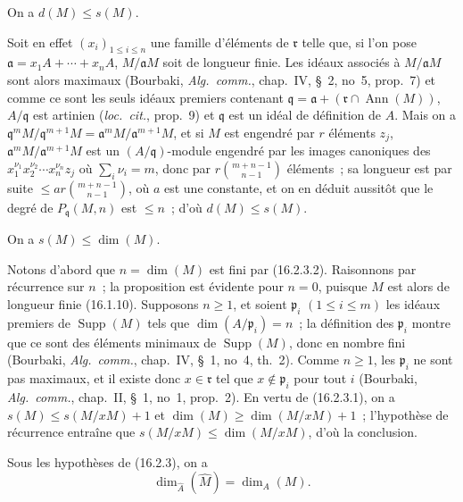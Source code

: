 \begin{env}[16.2.3.3]
\label{0.16.2.3.3-fr}
On a $d(M)\leq s(M)$.
\end{env}

Soit en effet $(x_i)_{1\leq i\leq n}$ une famille d'éléments de
$\mathfrak{r}$ telle que, si l'on pose
$\mathfrak{a}=x_1A+\cdots+x_nA$, $M/\mathfrak{a}M$ soit de longueur finie.
Les idéaux associés à $M/\mathfrak{a}M$ sont alors maximaux (Bourbaki,
\emph{Alg.~comm.}, chap.~IV, \S~2, no~5, prop.~7) et comme ce sont les seuls
idéaux premiers contenant
$\mathfrak{q}=\mathfrak{a}+(\mathfrak{r}\cap\operatorname{Ann}(M))$,
$A/\mathfrak{q}$ est artinien (\emph{loc.~cit.}, prop.~9) et $\mathfrak{q}$
est un idéal de définition de $A$. Mais on a
$\mathfrak{q}^mM/\mathfrak{q}^{m+1}M=
\mathfrak{a}^mM/\mathfrak{a}^{m+1}M$, et si $M$ est engendré par $r$ éléments
$z_j$, $\mathfrak{a}^mM/\mathfrak{a}^{m+1}M$ est un $(A/\mathfrak{q})$-module
engendré par les images canoniques des
$x_1^{\nu_1}x_2^{\nu_2}\cdots x_n^{\nu_n}z_j$ où
$\sum_i\nu_i=m$, donc par $r\binom{m+n-1}{n-1}$ éléments~; sa longueur est
par suite $\leq ar\binom{m+n-1}{n-1}$, où $a$ est une constante, et on en
déduit aussitôt que le degré de $P_{\mathfrak{q}}(M,n)$ est $\leq n$~; d'où
$d(M)\leq s(M)$.

\begin{env}[16.2.3.4]
\label{0.16.2.3.4-fr}
On a $s(M)\leq\dim(M)$.
\end{env}

Notons d'abord que $n=\dim(M)$ est fini par (16.2.3.2). Raisonnons par
récurrence sur $n$~; la proposition est évidente pour $n=0$, puisque $M$ est
alors de longueur finie (16.1.10). Supposons $n\geq1$, et soient
$\mathfrak{p}_i$ $(1\leq i\leq m)$ les idéaux premiers de
$\operatorname{Supp}(M)$ tels que $\dim(A/\mathfrak{p}_i)=n$~; la définition
des $\mathfrak{p}_i$ montre que ce sont des éléments minimaux de
$\operatorname{Supp}(M)$, donc en nombre fini (Bourbaki, \emph{Alg.~comm.},
chap.~IV, \S~1, no~4, th.~2). Comme $n\geq1$, les $\mathfrak{p}_i$ ne sont pas
maximaux, et il existe donc $x\in\mathfrak{r}$ tel que
$x\notin\mathfrak{p}_i$ pour tout $i$ (Bourbaki, \emph{Alg.~comm.}, chap.~II,
\S~1, no~1, prop.~2). En vertu de (16.2.3.1), on a
$s(M)\leq s(M/xM)+1$ et $\dim(M)\geq\dim(M/xM)+1$~; l'hypothèse de récurrence
entraîne que $s(M/xM)\leq\dim(M/xM)$, d'où la conclusion.

\begin{corollary}[16.2.4]
\label{0.16.2.4-fr}
Sous les hypothèses de (16.2.3), on a
\begin{equation}
\label{0.16.2.4.1-fr}
\tag{16.2.4.1}
  \dim_{\widehat{A}}(\widehat{M})=\dim_A(M).
\end{equation}
\end{corollary}

